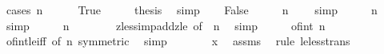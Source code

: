 \begin{isabellebody}
%
\isadelimproof
%
\endisadelimproof
%
\isatagproof
{}\isamarkupfalse%
\ {\isacharparenleft}{\kern0pt}cases\ {\isachardoublequoteopen}n\ {\isacharequal}{\kern0pt}\ {}{\isachardoublequoteclose}{\isacharparenright}{\kern0pt}\isanewline
\ \ \isamarkupfalse%
\ True\isanewline
\ \ \isamarkupfalse%
\ \isamarkupfalse%
\ {\isacharquery}{\kern0pt}thesis\ \isamarkupfalse%
\ simp\isanewline
{}\isamarkupfalse%
\isanewline
\ \ \isamarkupfalse%
\ False\isanewline
\ \ \isamarkupfalse%
\ \isamarkupfalse%
\ {\isachardoublequoteopen}{\isasymbar}n{\isasymbar}\ {\isasymnoteq}\ {}{\isachardoublequoteclose}\ \isamarkupfalse%
\ simp\isanewline
\ \ \isamarkupfalse%
\ \isamarkupfalse%
\ {\isachardoublequoteopen}{\isasymbar}n{\isasymbar}\ {\isachargreater}{\kern0pt}\ {}{\isachardoublequoteclose}\ \isamarkupfalse%
\ simp\isanewline
\ \ \isamarkupfalse%
\ \isamarkupfalse%
\ {\isachardoublequoteopen}{\isasymbar}n{\isasymbar}\ {\isasymge}\ {}{\isachardoublequoteclose}\isanewline
\ \ \ \ \isamarkupfalse%
\ zless{\isacharunderscore}{\kern0pt}imp{\isacharunderscore}{\kern0pt}add{}{\isacharunderscore}{\kern0pt}zle\ {\isacharbrackleft}{\kern0pt}of\ {}\ {\isachardoublequoteopen}{\isasymbar}n{\isasymbar}{\isachardoublequoteclose}{\isacharbrackright}{\kern0pt}\ \isamarkupfalse%
\ simp\isanewline
\ \ \isamarkupfalse%
\ \isamarkupfalse%
\ {\isachardoublequoteopen}{\isasymbar}of{\isacharunderscore}{\kern0pt}int\ n{\isasymbar}\ {\isasymge}\ {}{\isachardoublequoteclose}\isanewline
\ \ \ \ \isamarkupfalse%
\ of{\isacharunderscore}{\kern0pt}int{\isacharunderscore}{\kern0pt}{}{\isacharunderscore}{\kern0pt}le{\isacharunderscore}{\kern0pt}iff\ {\isacharbrackleft}{\kern0pt}of\ {\isachardoublequoteopen}{\isasymbar}n{\isasymbar}{\isachardoublequoteclose}{\isacharcomma}{\kern0pt}\ symmetric{\isacharbrackright}{\kern0pt}\ \isamarkupfalse%
\ simp\isanewline
\ \ \isamarkupfalse%
\ \isamarkupfalse%
\ {\isachardoublequoteopen}{}\ {\isacharless}{\kern0pt}\ x{\isachardoublequoteclose}\ \isamarkupfalse%
\ assms\ \isamarkupfalse%
\ {\isacharparenleft}{\kern0pt}rule\ le{\isacharunderscore}{\kern0pt}less{\isacharunderscore}{\kern0pt}trans{\isacharparenright}{\kern0pt}\isanewline

\end{isabellebody}
